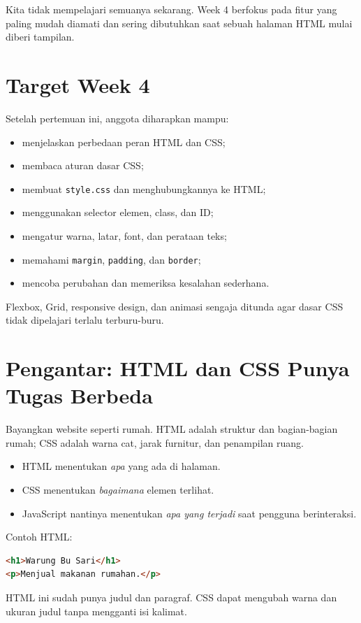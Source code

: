 \documentclass[11pt,a4paper]{article}
\begin{document}
\begin{ingat}
Kita tidak mempelajari semuanya sekarang. Week 4 berfokus pada fitur yang paling mudah diamati dan sering dibutuhkan saat sebuah halaman HTML mulai diberi tampilan.
\end{ingat}

\section{Target Week 4}
Setelah pertemuan ini, anggota diharapkan mampu:
\begin{itemize}[leftmargin=*]
\item menjelaskan perbedaan peran HTML dan CSS;
\item membaca aturan dasar CSS;
\item membuat \texttt{style.css} dan menghubungkannya ke HTML;
\item menggunakan selector elemen, class, dan ID;
\item mengatur warna, latar, font, dan perataan teks;
\item memahami \texttt{margin}, \texttt{padding}, dan \texttt{border};
\item mencoba perubahan dan memeriksa kesalahan sederhana.
\end{itemize}
Flexbox, Grid, responsive design, dan animasi sengaja ditunda agar dasar CSS tidak dipelajari terlalu terburu-buru.

\section{Pengantar: HTML dan CSS Punya Tugas Berbeda}
Bayangkan website seperti rumah. HTML adalah struktur dan bagian-bagian rumah; CSS adalah warna cat, jarak furnitur, dan penampilan ruang.

\begin{itemize}[leftmargin=*]
\item HTML menentukan \textit{apa} yang ada di halaman.
\item CSS menentukan \textit{bagaimana} elemen terlihat.
\item JavaScript nantinya menentukan \textit{apa yang terjadi} saat pengguna berinteraksi.
\end{itemize}

Contoh HTML:
\begin{lstlisting}[language=HTML]
<h1>Warung Bu Sari</h1>
<p>Menjual makanan rumahan.</p>
\end{lstlisting}
HTML ini sudah punya judul dan paragraf. CSS dapat mengubah warna dan ukuran judul tanpa mengganti isi kalimat.
\end{document}
